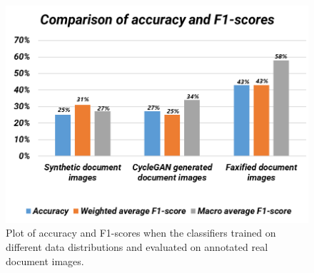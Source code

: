\begin{figure}[H]
        \begin{center}
	    \includegraphics[scale=0.60]{images/Evaluation/ComparisonOfAccuracyAndF1Score.png}
	    \caption[Plot of accuracy and F1-scores when the classifiers trained on different data distributions and evaluated on annotated real document images.]{Plot of accuracy and F1-scores when the classifiers trained on different data distributions and evaluated on annotated real document images.}
	    \label{fig:ComparisonOfAccuracyAndF1Score}
	    \end{center}
\end{figure}

